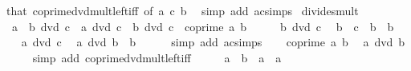 \begin{isabellebody}
\isamarkupfalse%
\ that\ coprime{\isacharunderscore}{\kern0pt}dvd{\isacharunderscore}{\kern0pt}mult{\isacharunderscore}{\kern0pt}left{\isacharunderscore}{\kern0pt}iff\ {\isacharbrackleft}{\kern0pt}of\ a\ c\ b{\isacharbrackright}{\kern0pt}\ \isamarkupfalse%
\ {\isacharparenleft}{\kern0pt}simp\ add{\isacharcolon}{\kern0pt}\ ac{\isacharunderscore}{\kern0pt}simps{\isacharparenright}{\kern0pt}%
\endisatagproof
{\isafoldproof}%
%
\isadelimproof
\isanewline
%
\endisadelimproof
\isanewline
{}\isamarkupfalse%
\ divides{\isacharunderscore}{\kern0pt}mult{\isacharcolon}{\kern0pt}\isanewline
\ \ {\isachardoublequoteopen}a\ {\isacharasterisk}{\kern0pt}\ b\ dvd\ c{\isachardoublequoteclose}\ \ {\isachardoublequoteopen}a\ dvd\ c{\isachardoublequoteclose}\ \ {\isachardoublequoteopen}b\ dvd\ c{\isachardoublequoteclose}\ \ {\isachardoublequoteopen}coprime\ a\ b{\isachardoublequoteclose}\isanewline
%
\isadelimproof
%
\endisadelimproof
%
\isatagproof
{}\isamarkupfalse%
\ {\isacharminus}{\kern0pt}\isanewline
\ \ \isamarkupfalse%
\ {\isacartoucheopen}b\ dvd\ c{\isacartoucheclose}\ \isamarkupfalse%
\ b{\isacharprime}{\kern0pt}\ \ {\isachardoublequoteopen}c\ {\isacharequal}{\kern0pt}\ b\ {\isacharasterisk}{\kern0pt}\ b{\isacharprime}{\kern0pt}{\isachardoublequoteclose}\ \isacommand{{\isachardot}{\kern0pt}{\isachardot}{\kern0pt}}\isamarkupfalse%
\isanewline
\ \ \isamarkupfalse%
\ {\isacartoucheopen}a\ dvd\ c{\isacartoucheclose}\ \isamarkupfalse%
\ {\isachardoublequoteopen}a\ dvd\ b{\isacharprime}{\kern0pt}\ {\isacharasterisk}{\kern0pt}\ b{\isachardoublequoteclose}\isanewline
\ \ \ \ \isamarkupfalse%
\ {\isacharparenleft}{\kern0pt}simp\ add{\isacharcolon}{\kern0pt}\ ac{\isacharunderscore}{\kern0pt}simps{\isacharparenright}{\kern0pt}\isanewline
\ \ \isamarkupfalse%
\ {\isacartoucheopen}coprime\ a\ b{\isacartoucheclose}\ \isamarkupfalse%
\ {\isachardoublequoteopen}a\ dvd\ b{\isacharprime}{\kern0pt}{\isachardoublequoteclose}\isanewline
\ \ \ \ \isamarkupfalse%
\ {\isacharparenleft}{\kern0pt}simp\ add{\isacharcolon}{\kern0pt}\ coprime{\isacharunderscore}{\kern0pt}dvd{\isacharunderscore}{\kern0pt}mult{\isacharunderscore}{\kern0pt}left{\isacharunderscore}{\kern0pt}iff{\isacharparenright}{\kern0pt}\isanewline
\ \ \isamarkupfalse%
\ \isamarkupfalse%
\ a{\isacharprime}{\kern0pt}\ \ {\isachardoublequoteopen}b{\isacharprime}{\kern0pt}\ {\isacharequal}{\kern0pt}\ a\ {\isacharasterisk}{\kern0pt}\ a{\isacharprime}{\kern0pt}{\isachardoublequoteclose}\ \isacommand{{\isachardot}{\kern0pt}{\isachardot}{\kern0pt}}\isamarkupfalse%

\end{isabellebody}
